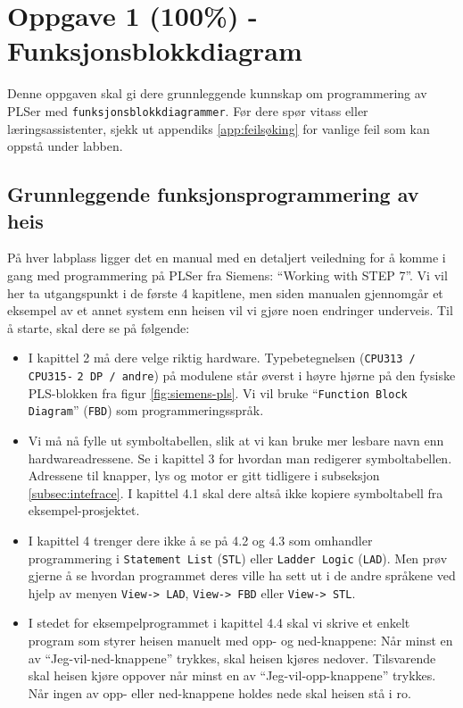 \section{Oppgave 1 (100\%) - Funksjonsblokkdiagram}\label{sec:3-oppgave1}

Denne oppgaven skal gi dere grunnleggende kunnskap om programmering av PLSer med \verb|funksjonsblokkdiagrammer|. Før dere spør vitass eller læringsassistenter, sjekk ut appendiks \ref{app:feilsøking} for vanlige feil som kan oppstå under labben.

\subsection{Grunnleggende funksjonsprogrammering av heis}

På hver labplass ligger det en manual med en detaljert veiledning for å komme i gang med programmering på PLSer fra Siemens: “Working with STEP 7”. Vi vil her ta utgangspunkt i de første 4 kapitlene, men siden manualen gjennomgår et eksempel av et annet system enn heisen
vil vi gjøre noen endringer underveis. Til å starte, skal dere se på følgende:

\begin{itemize}
        \item I kapittel 2 må dere velge riktig hardware. Typebetegnelsen (\verb|CPU313 / CPU315-| 
        \verb|2 DP / andre|) på modulene står øverst i høyre hjørne på den fysiske PLS-blokken fra figur \ref{fig:siemens-pls}. Vi vil bruke “\verb|Function Block Diagram|” (\verb|FBD|) som
programmeringsspråk.


\item Vi må nå fylle ut symboltabellen, slik at vi kan bruke mer lesbare navn enn hardwareadressene.
Se i kapittel 3 for hvordan man redigerer symboltabellen. Adressene til
knapper, lys og motor er gitt tidligere i subseksjon \ref{subsec:intefrace}. I kapittel 4.1 skal dere altså ikke
kopiere symboltabell fra eksempel-prosjektet.

\item I kapittel 4 trenger dere ikke å se på 4.2 og 4.3 som omhandler programmering i \verb|Statement List| (\verb|STL|) eller \verb|Ladder Logic| (\verb|LAD|). Men prøv gjerne å se hvordan programmet deres ville
ha sett ut i de andre språkene ved hjelp av menyen \verb|View-> LAD|, \verb|View-> FBD| eller \verb|View-> STL|.
\item I stedet for eksempelprogrammet i kapittel 4.4 skal vi skrive et enkelt program som styrer
heisen manuelt med opp- og ned-knappene: Når minst en av “Jeg-vil-ned-knappene”
trykkes, skal heisen kjøres nedover. Tilsvarende skal heisen kjøre oppover når minst en av
“Jeg-vil-opp-knappene” trykkes. Når ingen av opp- eller ned-knappene holdes nede skal
heisen stå i ro.
\end{itemize}

